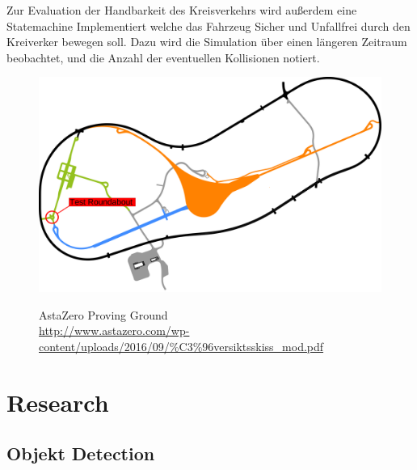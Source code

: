 \documentclass[11pt,oneside,openright]{mpreport}
\begin{document}
Zur Evaluation der Handbarkeit des Kreisverkehrs wird außerdem eine Statemachine Implementiert welche das Fahrzeug Sicher und Unfallfrei
durch den Kreiverker bewegen soll. Dazu wird die Simulation über einen längeren Zeitraum beobachtet, und die Anzahl der eventuellen
Kollisionen notiert.

\begin{figure}[!ht]
\caption{AstaZero Proving Ground\\ \url{http://www.astazero.com/wp-content/uploads/2016/09/\%C3\%96versiktsskiss_mod.pdf} }
\includegraphics[width=\textwidth]{bilder/AstaZero.pdf}
\label{astazero}
\end{figure}



\chapter{Research}
\section{Objekt Detection}
\end{document}
